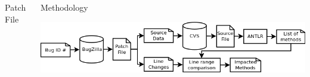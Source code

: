 \documentclass[final]{beamer}
\begin{document}
\begin{frame}{}
\begin{columns}[t]
\begin{column}{.32\linewidth}
\begin{block}{\large\sc Patch File}
\begin{minipage}[t]{0.95\linewidth}
                \end{minipage}
                \vspace*{-0.5em}
            \end{block}
        \end{column}


        \begin{column}{.66\linewidth}
            \begin{block}{\large\sc Methodology}
                \vspace*{-0.25em}
                \centering
                \begin{minipage}[t]{0.975\linewidth}
\centering
\includegraphics[width=\linewidth]{processwider}
\large
\justifying

                \end{minipage}
                \vspace*{0.46em}
            \end{block}



\end{column}
\end{columns}
\end{frame}
\end{document}
